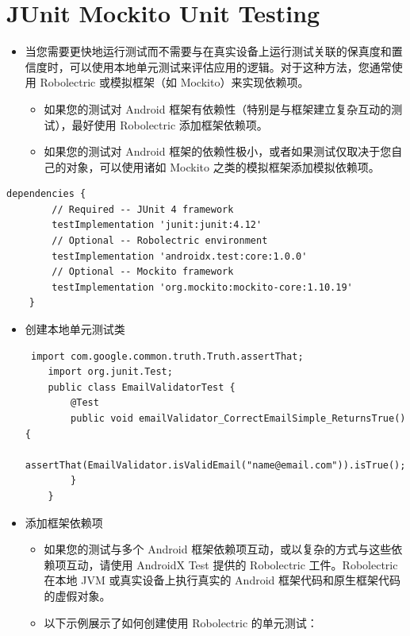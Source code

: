 \documentclass[9pt, b5paper]{article}
\begin{document}
\section{JUnit Mockito Unit Testing}
\label{sec-2}
\begin{itemize}
\item 当您需要更快地运行测试而不需要与在真实设备上运行测试关联的保真度和置信度时，可以使用本地单元测试来评估应用的逻辑。对于这种方法，您通常使用 Robolectric 或模拟框架（如 Mockito）来实现依赖项。
\begin{itemize}
\item 如果您的测试对 Android 框架有依赖性（特别是与框架建立复杂互动的测试），最好使用 Robolectric 添加框架依赖项。
\item 如果您的测试对 Android 框架的依赖性极小，或者如果测试仅取决于您自己的对象，可以使用诸如 Mockito 之类的模拟框架添加模拟依赖项。
\end{itemize}
\end{itemize}
\begin{verbatim}
dependencies {
        // Required -- JUnit 4 framework
        testImplementation 'junit:junit:4.12'
        // Optional -- Robolectric environment
        testImplementation 'androidx.test:core:1.0.0'
        // Optional -- Mockito framework
        testImplementation 'org.mockito:mockito-core:1.10.19'
    }
\end{verbatim}
\begin{itemize}
\item 创建本地单元测试类
\begin{verbatim}
 import com.google.common.truth.Truth.assertThat;
    import org.junit.Test;
    public class EmailValidatorTest {
        @Test
        public void emailValidator_CorrectEmailSimple_ReturnsTrue() {
            assertThat(EmailValidator.isValidEmail("name@email.com")).isTrue();
        }
    }
\end{verbatim}
\item 添加框架依赖项 
\begin{itemize}
\item 如果您的测试与多个 Android 框架依赖项互动，或以复杂的方式与这些依赖项互动，请使用 AndroidX Test 提供的 Robolectric 工件。Robolectric 在本地 JVM 或真实设备上执行真实的 Android 框架代码和原生框架代码的虚假对象。
\item 以下示例展示了如何创建使用 Robolectric 的单元测试：
\end{itemize}
\end{itemize}
\end{document}
